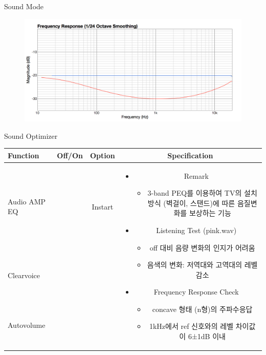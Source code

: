 \documentclass{beamer}
\begin{document}
\begin{frame}[t]{Sound Mode}
		\begin{figure}[b]
			\includegraphics[height=0.32\textwidth]{figure/soundmode.png}
		\end{figure}
		
	\end{frame}
	
	
	\begin{frame}[t]{Sound Optimizer}
		\begin{tiny}
			\begin{tabular}{@{}lccc@{}}
				\toprule
				Function & Off/On & Option & Specification \\
				\midrule
				Audio AMP EQ & \color{black}{Off} & Instart &
				\multirow{14}{60mm}{
					\begin{itemize}
						\item Remark
						\begin{itemize}
							\item 3-band PEQ를 이용하여 TV의 설치 방식 (벽걸이, 스탠드)에 따른 음질변화를 보상하는 기능
						\end{itemize}
						\item Listening Test (pink.wav)
						\begin{itemize}
							\item off 대비 음량 변화의 인지가 어려움
							\item 음색의 변화: 저역대와 고역대의 레벨 감소
						\end{itemize}
						\item Frequency Response Check
						\begin{itemize}
							\item concave 형태 (n형)의 주파수응답
							\item 1kHz에서 ref 신호와의 레벨 차이값이 6±1dB 이내
						\end{itemize}
					\end{itemize}
				} \\
				Clearvoice & \color{black}{Off} & & \\
				Autovolume & \color{black}{Off} & & \\

\end{tabular}
\end{tiny}
\end{frame}
\end{document}
